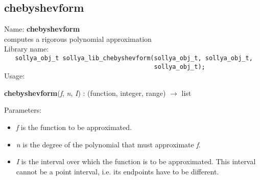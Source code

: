 \subsection{chebyshevform}
\label{labchebyshevform}
\noindent Name: \textbf{chebyshevform}\\
\phantom{aaa}computes a rigorous polynomial approximation\\[0.2cm]
\noindent Library name:\\
\verb|   sollya_obj_t sollya_lib_chebyshevform(sollya_obj_t, sollya_obj_t,|\\
\verb|                                         sollya_obj_t);|\\[0.2cm]
\noindent Usage: 
\begin{center}
\textbf{chebyshevform}(\emph{f}, \emph{n}, \emph{I}) : (\textsf{function}, \textsf{integer}, \textsf{range}) $\rightarrow$ \textsf{list}\\
\end{center}
Parameters: 
\begin{itemize}
\item \emph{f} is the function to be approximated.
\item \emph{n} is the degree of the polynomial that must approximate \emph{f}.
\item \emph{I} is the interval over which the function is to be approximated. This interval cannot be a point interval, i.e. its endpoints have to be different.
\end{itemize}
